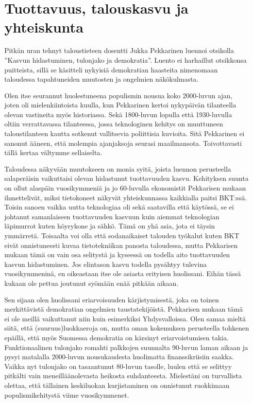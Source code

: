 \documentclass[12pt]{article}
\begin{document}
\newpage
\section{Tuottavuus, talouskasvu ja yhteiskunta}

Pitkän uran tehnyt taloustieteen dosentti Jukka Pekkarinen luennoi otsikolla ''Kasvun hidastuminen, tulonjako ja demokratia''. Luento ei harhaillut otsikkonsa puitteista, sillä se käsitteli nykyisiä demokratian haasteita nimenomaan taloudessa tapahtuneiden muutosten ja ongelmien näkökulmasta.

Olen itse seurannut huolestuneena populismin nousua koko 2000-luvun ajan, joten oli mielenkiintoista kuulla, kun Pekkarinen kertoi nykypäivän tilanteella olevan vastineita myös historiassa. Sekä 1800-luvun lopulla että 1930-luvulla oltiin verrattavassa tilanteessa, jossa teknologinen kehitys on muuttuneen taloustilanteen kautta sotkenut vallitsevia poliittisia kuvioita. Sitä Pekkarinen ei sanonut ääneen, että molempia ajanjaksoja seurasi maailmansota. Toivottavasti tällä kertaa vältymme sellaiselta.

Taloudessa näkyvään muutokseen on monia syitä, joista luennon perusteella salaperäisin vaikuttaisi olevan hidastunut tuottavuuden kasvu. Kehityksen suunta on ollut alaspäin vuosikymmeniä ja jo 60-luvulla ekonomistit Pekkarisen mukaan ihmettelivät, miksi tietokoneet näkyvät yhteiskunnassa kaikkialla paitsi BKT:ssä. Toisin sanoen vaikka uutta teknologiaa oli sekä saatavilla että käytössä, se ei johtanut samanlaiseen tuottavuuden kasvuun kuin aiemmat teknologian läpimurrot kuten höyrykone ja sähkö. Tämä on yhä asia, jota ei täysin ymmärretä. Toisaalta voi olla että sodanaikaiset talouden työkalut kuten BKT eivät onnistuneesti kuvaa tietotekniikan panosta taloudessa, mutta Pekkarisen mukaan tämä on vain osa selitystä ja kyseessä on todella aito tuottavuuden kasvun hidastuminen. Jos elintason kasvu todella pysähtyy tulevina vuosikymmeninä, en oikeastaan itse ole asiasta erityisen huolissani. Eihän tässä kukaan ole pettua joutunut syömään enää pitkään aikaan.

Sen sijaan olen huolissani eriarvoisuuden kärjistymisestä, joka on toinen merkittävistä demokratian ongelmien taustatekijöistä. Pekkarisen mukaan tämä ei ole meillä vaikuttanut niin kuin esimerkiksi Yhdysvalloissa. Olen samaa mieltä siitä, että (suuruus)luokkaeroja on, mutta oman kokemuksen perusteella tohkenen epäillä, että myös Suomessa demokratia on kärsinyt eriarvoistumisen takia. Funktionaalinen tulonjako romahti palkkojen suunnalta 90-luvun laman aikaan ja pysyi matalalla 2000-luvun nousukaudesta huolimatta finanssikriisiin saakka. Vaikka nyt tulonjako on tasaantunut 80-luvun tasolle, luulen että se selittyy pitkälti vain meneilläänolevasta heikosta suhdanteesta. Mielestäni on turvallista olettaa, että tällainen keskiluokan kurjistaminen on onnistunut ruokkimaan populismikehitystä viime vuosikymmenet.
\end{document}
